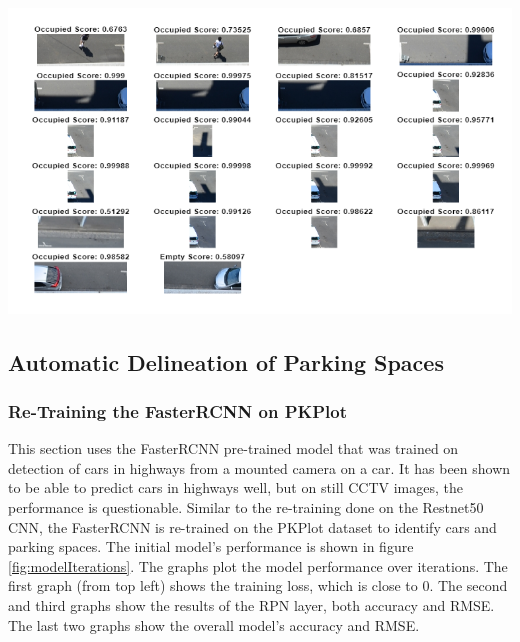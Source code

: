 \documentclass[man]{apa7}
\begin{document}
\begin{minipage}{\linewidth}
  \includegraphics[height=\textheight/2,width=\textwidth/1]{figures/wrongPred.png}
  \label{fig:wrongPred}
\end{minipage}

\subsection{Automatic Delineation of Parking Spaces}

\subsubsection{Re-Training the FasterRCNN on PKPlot}

This section uses the FasterRCNN pre-trained model that was trained on detection of cars in highways from a mounted camera on a car. It has been shown to be able to predict cars in highways well, but on still CCTV images, the performance is questionable. Similar to the re-training done on the Restnet50 CNN, the FasterRCNN is re-trained on the PKPlot dataset to identify cars and parking spaces. The initial model's performance is shown in figure \ref{fig:modelIterations}. The graphs plot the model performance over iterations. The first graph (from top left) shows the training loss, which is close to 0. The second and third graphs show the results of the RPN layer, both accuracy and RMSE. The last two graphs show the overall model's accuracy and RMSE.
\end{document}
